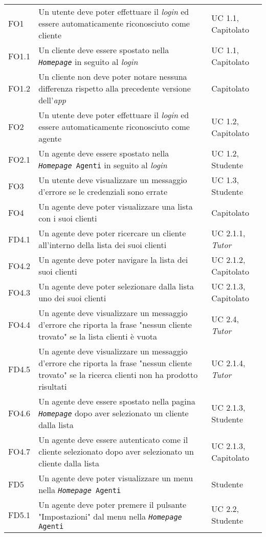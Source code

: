\begin{center}
\begin{longtable}{|p{2.25cm}|p{7.75cm}|p{2.25cm}|}
    FO1 & Un utente deve poter effettuare il \textit{login} ed essere automaticamente riconosciuto come cliente & UC 1.1, Capitolato \\
    FO1.1 & Un cliente deve essere spostato nella \textit{\texttt{Homepage}} in seguito al \textit{login} & UC 1.1, Capitolato \\
    FO1.2 & Un cliente non deve poter notare nessuna differenza rispetto alla precedente versione dell'\textit{app} & Capitolato \\
    FO2 & Un utente deve poter effettuare il \textit{login} ed essere automaticamente riconosciuto come agente & UC 1.2, Capitolato \\
    FO2.1 & Un agente deve essere spostato nella \texttt{\textit{Homepage} Agenti} in seguito al \textit{login} & UC 1.2, Studente \\
    FO3 & Un utente deve visualizzare un messaggio d'errore se le credenziali sono errate & UC 1.3, Studente \\
    FO4 & Un agente deve poter visualizzare una lista con i suoi clienti & Capitolato \\
    FD4.1 & Un agente deve poter ricercare un cliente all'interno della lista dei suoi clienti & UC 2.1.1, \textit{Tutor} \\
    FO4.2 & Un agente deve poter navigare la lista dei suoi clienti & UC 2.1.2, Capitolato \\
    FO4.3 & Un agente deve poter selezionare dalla lista uno dei suoi clienti & UC 2.1.3, Capitolato \\
    FO4.4 & Un agente deve visualizzare un messaggio d'errore che riporta la frase "nessun cliente trovato" se la lista clienti è vuota & UC 2.4, \textit{Tutor} \\
    FD4.5 & Un agente deve visualizzare un messaggio d'errore che riporta la frase "nessun cliente trovato" se la ricerca clienti non ha prodotto risultati & UC 2.1.4, \textit{Tutor} \\
    FO4.6 & Un agente deve essere spostato nella pagina \textit{\texttt{Homepage}} dopo aver selezionato un cliente dalla lista & UC 2.1.3, Studente \\
    FO4.7 & Un agente deve essere autenticato come il cliente selezionato dopo aver selezionato un cliente dalla lista & UC 2.1.3, Capitolato \\
    FD5 & Un agente deve poter visualizzare un menu nella \texttt{\textit{Homepage} Agenti} & Studente \\
    FD5.1 & Un agente deve poter premere il pulsante "Impostazioni" dal menu nella \texttt{\textit{Homepage} Agenti} & UC 2.2, Studente \\

\end{longtable}
\end{center}
